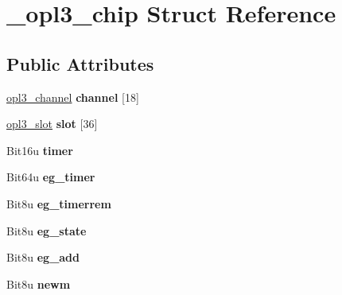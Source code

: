 \hypertarget{struct__opl3__chip}{\section{\-\_\-opl3\-\_\-chip Struct Reference}
\label{struct__opl3__chip}
}
\subsection*{Public Attributes}
\begin{DoxyCompactItemize}
\item 
\hypertarget{struct__opl3__chip_a14d26643f12e00aac232ab2d26ecfa11}{\hyperlink{struct__opl3__channel}{opl3\-\_\-channel} {\bfseries channel} \mbox{[}18\mbox{]}}\label{struct__opl3__chip_a14d26643f12e00aac232ab2d26ecfa11}

\item 
\hypertarget{struct__opl3__chip_aa3abe4a1cf3435a791f704a6ae56d304}{\hyperlink{struct__opl3__slot}{opl3\-\_\-slot} {\bfseries slot} \mbox{[}36\mbox{]}}\label{struct__opl3__chip_aa3abe4a1cf3435a791f704a6ae56d304}

\item 
\hypertarget{struct__opl3__chip_acb66e2c886f8418dfd45f7562cc2aa15}{Bit16u {\bfseries timer}}\label{struct__opl3__chip_acb66e2c886f8418dfd45f7562cc2aa15}

\item 
\hypertarget{struct__opl3__chip_afa1bf342e32e8104edbd2a77d2d81178}{Bit64u {\bfseries eg\-\_\-timer}}\label{struct__opl3__chip_afa1bf342e32e8104edbd2a77d2d81178}

\item 
\hypertarget{struct__opl3__chip_a1ab67448be0eeae213409c6db126e611}{Bit8u {\bfseries eg\-\_\-timerrem}}\label{struct__opl3__chip_a1ab67448be0eeae213409c6db126e611}

\item 
\hypertarget{struct__opl3__chip_a96f918098b6786b8bc7fbdad224b1ba9}{Bit8u {\bfseries eg\-\_\-state}}\label{struct__opl3__chip_a96f918098b6786b8bc7fbdad224b1ba9}

\item 
\hypertarget{struct__opl3__chip_a43226b00d60d6b6b9c092d87ceb2158e}{Bit8u {\bfseries eg\-\_\-add}}\label{struct__opl3__chip_a43226b00d60d6b6b9c092d87ceb2158e}

\item 
\hypertarget{struct__opl3__chip_a2a47643e3ec56ff1d6e7a9c7a28f0027}{Bit8u {\bfseries newm}}\label{struct__opl3__chip_a2a47643e3ec56ff1d6e7a9c7a28f0027}


\end{DoxyCompactItemize}
